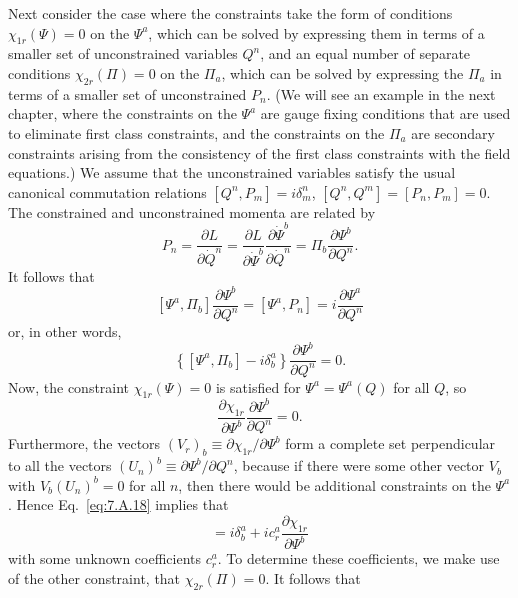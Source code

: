 Next consider the case where the constraints take the form of conditions
$\chi_{1r}(\Psi)=0$ on the $\Psi^a$, which can be solved by expressing them in
terms of a smaller set of unconstrained variables $Q^n$, and an equal number
of separate conditions $\chi_{2r}(\Pi)=0$ on the $\Pi_a$, which can be solved
by expressing the $\Pi_a$ in terms of a smaller set of unconstrained $P_n$.
(We will see an example in the next chapter, where the constraints on the
$\Psi^a$ are gauge fixing conditions that are used to eliminate first class
constraints, and the constraints on the $\Pi_a$ are secondary constraints
arising from the consistency of the first class constraints with the field
equations.) We assume that the unconstrained variables satisfy the usual
canonical commutation relations
$[Q^n,P_m]=i\delta^n_m$, $[Q^n,Q^m]=[P_n,P_m]=0$. The constrained and
unconstrained momenta are related by
\begin{equation}
  P_n=\frac{\partial L}{\partial\dot Q^n}
  =\frac{\partial L}{\partial\dot\Psi^b}
    \frac{\partial\dot\Psi^b}{\partial\dot Q^n}
  =\Pi_b\frac{\partial\Psi^b}{\partial Q^n}.
  \tag{7.A.17}\label{eq:7.A.17}
\end{equation}
It follows that
\[
  [\Psi^a,\Pi_b]\frac{\partial\Psi^b}{\partial Q^n}
  =[\Psi^a,P_n]=i\frac{\partial\Psi^a}{\partial Q^n}
\]
or, in other words,
\begin{equation}
  \left\{[\Psi^a,\Pi_b]-i\delta^a_b\right\}
  \frac{\partial\Psi^b}{\partial Q^n}=0.
  \tag{7.A.18}\label{eq:7.A.18}
\end{equation}
Now, the constraint $\chi_{1r}(\Psi)=0$ is satisfied for
$\Psi^a=\Psi^a(Q)$ for all $Q$, so
\begin{equation}
  \frac{\partial\chi_{1r}}{\partial\Psi^b}
  \frac{\partial\Psi^b}{\partial Q^n}=0.
  \tag{7.A.19}\label{eq:7.A.19}
\end{equation}
Furthermore, the vectors $(V_r)_b\equiv\partial\chi_{1r}/\partial\Psi^b$
form a complete set perpendicular to all the vectors
$(U_n)^b\equiv\partial\Psi^b/\partial Q^n$, because if there were some other
vector $V_b$ with $V_b(U_n)^b=0$ for all $n$, then there would be additional
constraints on the $\Psi^a$. Hence Eq.~\eqref{eq:7.A.18} implies that
\begin{equation}
  [\Psi^a,\Pi_b]=i\delta^a_b+ic^a_r
  \frac{\partial\chi_{1r}}{\partial\Psi^b}
  \tag{7.A.20}\label{eq:7.A.20}
\end{equation}
with some unknown coefficients $c^a_r$. To determine these coefficients, we
make use of the other constraint, that $\chi_{2r}(\Pi)=0$. It follows that
